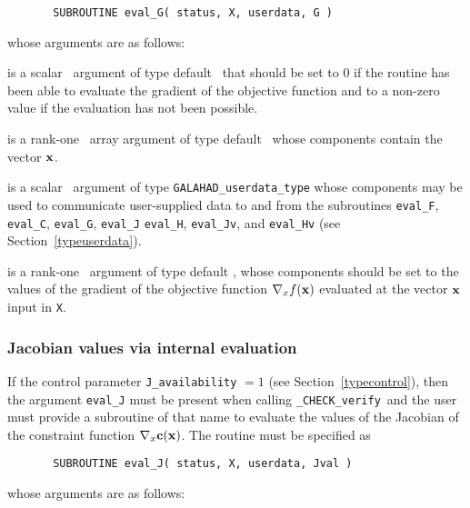 \documentclass{galahad}
\newcommand{\packagename}{CHECK}
\newcommand{\fullpackagename}{\libraryname\_\packagename}
\newcommand{\solver}{{\tt \fullpackagename\_verify}}
\begin{document}
\def\baselinestretch{0.8}
{\tt \begin{verbatim}
       SUBROUTINE eval_G( status, X, userdata, G ) \end{verbatim} }
\def\baselinestretch{1.0}
\noindent whose arguments are as follows:

\begin{description}
 is a scalar \intentout\ argument of type default \integer\
that should be set to 0 if the routine has been able to evaluate
the gradient of the objective function
and to a non-zero value if the evaluation has not been possible.

 is a rank-one \intentin\ array argument of type default \realdp\
whose components contain the vector ${\mathbf{x}}$.

 is a scalar \intentinout\ argument of type 
{\tt GALAHAD\_userdata\_type} whose components may be used
to communicate user-supplied data to and from the
subroutines {\tt eval\_F}, {\tt eval\_C}, {\tt eval\_G}, {\tt eval\_J}
{\tt eval\_H}, {\tt eval\_Jv}, and {\tt eval\_Hv} 
(see Section~\ref{typeuserdata}).

 is a rank-one \intentout\ argument of type default \realdp,
whose components should be set to the values of the gradient 
of the objective function $\nabla_x f({\mathbf{x}})$
evaluated at the vector ${\mathbf{x}}$ input in {\tt X}.

\end{description}


\subsubsection{Jacobian values via internal evaluation\label{jfv}}

If the control parameter {\tt J\_availability} $=1$ (see
Section~\ref{typecontrol}), then the argument {\tt eval\_J} must be
present when calling \solver\ and the
user must provide a subroutine of that name to evaluate the
values of the Jacobian of the constraint function $\nabla_x {\mathbf{c}}({\mathbf{x}})$.
The routine must be specified as

\def\baselinestretch{0.8}
{\tt \begin{verbatim}
       SUBROUTINE eval_J( status, X, userdata, Jval ) \end{verbatim} }
\def\baselinestretch{1.0}
\noindent whose arguments are as follows:
\end{document}
